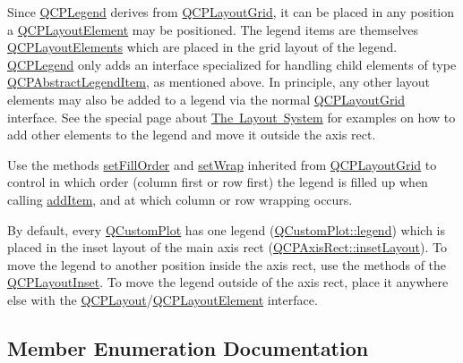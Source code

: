 Since \mbox{\hyperlink{class_q_c_p_legend}{Q\+C\+P\+Legend}} derives from \mbox{\hyperlink{class_q_c_p_layout_grid}{Q\+C\+P\+Layout\+Grid}}, it can be placed in any position a \mbox{\hyperlink{class_q_c_p_layout_element}{Q\+C\+P\+Layout\+Element}} may be positioned. The legend items are themselves \mbox{\hyperlink{class_q_c_p_layout_element}{Q\+C\+P\+Layout\+Elements}} which are placed in the grid layout of the legend. \mbox{\hyperlink{class_q_c_p_legend}{Q\+C\+P\+Legend}} only adds an interface specialized for handling child elements of type \mbox{\hyperlink{class_q_c_p_abstract_legend_item}{Q\+C\+P\+Abstract\+Legend\+Item}}, as mentioned above. In principle, any other layout elements may also be added to a legend via the normal \mbox{\hyperlink{class_q_c_p_layout_grid}{Q\+C\+P\+Layout\+Grid}} interface. See the special page about \mbox{\hyperlink{}{The Layout System}} for examples on how to add other elements to the legend and move it outside the axis rect.

Use the methods \mbox{\hyperlink{class_q_c_p_layout_grid_affc2f3cfd22f28698c5b29b960d2a391}{set\+Fill\+Order}} and \mbox{\hyperlink{class_q_c_p_layout_grid_ab36af18d77e4428386d02970382ee598}{set\+Wrap}} inherited from \mbox{\hyperlink{class_q_c_p_layout_grid}{Q\+C\+P\+Layout\+Grid}} to control in which order (column first or row first) the legend is filled up when calling \mbox{\hyperlink{class_q_c_p_legend_a3ab274de52d2951faea45a6d975e6b3f}{add\+Item}}, and at which column or row wrapping occurs.

By default, every \mbox{\hyperlink{class_q_custom_plot}{Q\+Custom\+Plot}} has one legend (\mbox{\hyperlink{class_q_custom_plot_a4eadcd237dc6a09938b68b16877fa6af}{Q\+Custom\+Plot\+::legend}}) which is placed in the inset layout of the main axis rect (\mbox{\hyperlink{class_q_c_p_axis_rect_a949f803466619924c7018df4b511ae10}{Q\+C\+P\+Axis\+Rect\+::inset\+Layout}}). To move the legend to another position inside the axis rect, use the methods of the \mbox{\hyperlink{class_q_c_p_layout_inset}{Q\+C\+P\+Layout\+Inset}}. To move the legend outside of the axis rect, place it anywhere else with the \mbox{\hyperlink{class_q_c_p_layout}{Q\+C\+P\+Layout}}/\mbox{\hyperlink{class_q_c_p_layout_element}{Q\+C\+P\+Layout\+Element}} interface. 

\subsection{Member Enumeration Documentation}
\mbox{\label{class_q_c_p_legend_a5404de8bc1e4a994ca4ae69e2c7072f1}} 
